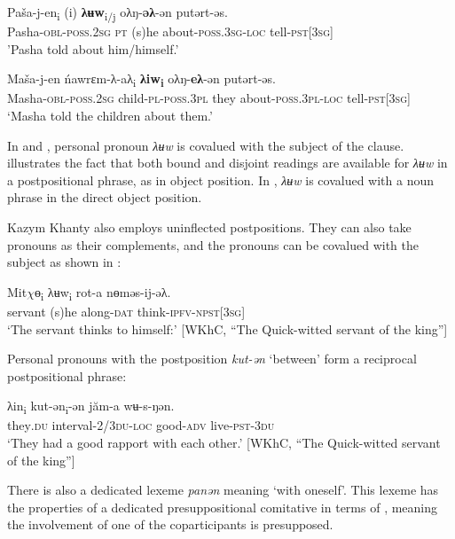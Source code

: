 \documentclass[output=paper]{langscibook}
\begin{document}
\ea 
\label{ex:Volkova:32}
 \gll Paša-j-en\textsubscript{i} (i) \textbf{λʉw}\textsubscript{i/j} oλŋ-\textbf{əλ}{}-ən putərt-əs.\\
 Pasha\textsc{{}-obl-poss.2sg pt} (s)he about\textsc{{}-poss.3sg-loc} tell\textsc{{}-pst[3sg]}\\
 \glt 'Pasha told about him/himself.’
\z

 

\ea 
\label{ex:Volkova:33}
 \gll Maša-j-en ńawrɛm-λ-aλ\textsubscript{i} \textbf{λiw\textsubscript{i}} oλŋ-\textbf{eλ}{}-ən putərt-əs.\\
 Masha\textsc{{}-obl-poss.2sg} child-\textsc{pl-poss.3pl} they about\textsc{{}-poss.3pl-loc} tell\textsc{{}-pst[3sg]}\\
 \glt ‘Masha told the children about them.’
\z

In  and , personal pronoun \textit{λʉw} is covalued with the subject of the clause.  illustrates the fact that both bound and disjoint readings are available for \textit{λʉw} in a postpositional phrase, as in object position. In , \textit{λʉw} is covalued with a noun phrase in the direct object position.

Kazym Khanty also employs uninflected postpositions. They can also take pronouns as their complements, and the pronouns can be covalued with the subject as shown in :

\ea 
\label{ex:Volkova:34}
 \gll Mit$\chi ɵ$\textsubscript{i} λʉw\textsubscript{i} rot-a nɵməs-ij-əλ.\\
 servant (s)he along\textsc{{}-dat} think\textsc{{}-ipfv-npst[3sg]}\\
 \glt ‘The servant thinks to himself:’ [WKhC, “The Quick-witted servant of the king”]
\z


Personal pronouns with the postposition \textit{kut-ən} ‘between’ form a reciprocal postpositional phrase:


 \ea 
\label{ex:Volkova:35}
 \gll λin\textsubscript{i} kut-ən\textsubscript{i}{}-ən jăm-a wʉ-s-ŋən.\\
 they\textsc{.du} interval\textsc{{}-2/3du-loc} good\textsc{{}-adv} live\textsc{{}-pst-3du}\\
 \glt ‘They had a good rapport with each other.’ [WKhC, “The Quick-witted servant of the king”]
\z


There is also a dedicated %
lexeme \textit{panən} meaning ‘with oneself’. This lexeme has the properties of a dedicated presuppositional comitative in terms of \citet{Perkova2018}, meaning the involvement of one of the coparticipants is presupposed.
\end{document}

